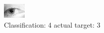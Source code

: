 \begin{figure}[h!]
\begin{center}
\includegraphics[width=0.60\columnwidth]{figures/ID1375_class_4_target_3.png}
\end{center}
\caption{ Classification: 4 actual target: 3}
\label{fig:ID1375_class_4_target_3}
\end{figure}
